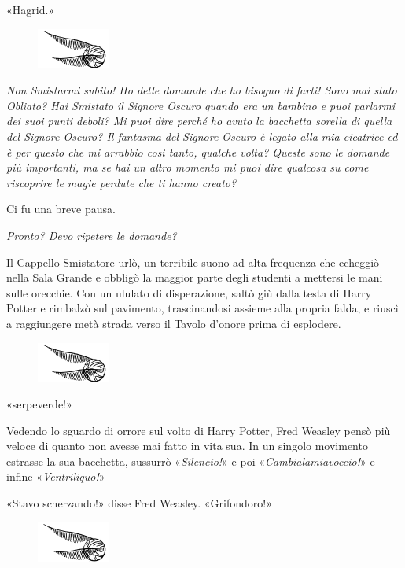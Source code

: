 «Hagrid.»

\begin{figure}[h]
	\includegraphics[scale=0.4]{boccino.png}
	\centering
\end{figure}

\textit{Non Smistarmi subito! Ho delle domande che ho bisogno di farti! Sono mai stato Obliato? Hai Smistato il Signore Oscuro quando era un bambino e puoi parlarmi dei suoi punti deboli? Mi puoi dire perché ho avuto la bacchetta sorella di quella del Signore Oscuro? Il fantasma del Signore Oscuro è legato alla mia cicatrice ed è per questo che mi arrabbio così tanto, qualche volta? Queste sono le domande più importanti, ma se hai un altro momento mi puoi dire qualcosa su come riscoprire le magie perdute che ti hanno creato?}

Ci fu una breve pausa.

\textit{Pronto? Devo ripetere le domande?}

Il Cappello Smistatore urlò, un terribile suono ad alta frequenza che echeggiò nella Sala Grande e obbligò la maggior parte degli studenti a mettersi le mani sulle orecchie. Con un ululato di disperazione, saltò giù dalla testa di Harry Potter e rimbalzò sul pavimento, trascinandosi assieme alla propria falda, e riuscì a raggiungere metà strada verso il Tavolo d’onore prima di esplodere.

\begin{figure}[h]
	\includegraphics[scale=0.4]{boccino.png}
	\centering
\end{figure}

«serpeverde!»

Vedendo lo sguardo di orrore sul volto di Harry Potter, Fred Weasley pensò più veloce di quanto non avesse mai fatto in vita sua. In un singolo movimento estrasse la sua bacchetta, sussurrò «\textit{Silencio!}» e poi «\textit{Cambialamiavoceio!}» e infine «\textit{Ventriliquo!}»

«Stavo scherzando!» disse Fred Weasley. «Grifondoro!»

\begin{figure}[h]
	\includegraphics[scale=0.4]{boccino.png}
	\centering
\end{figure}

